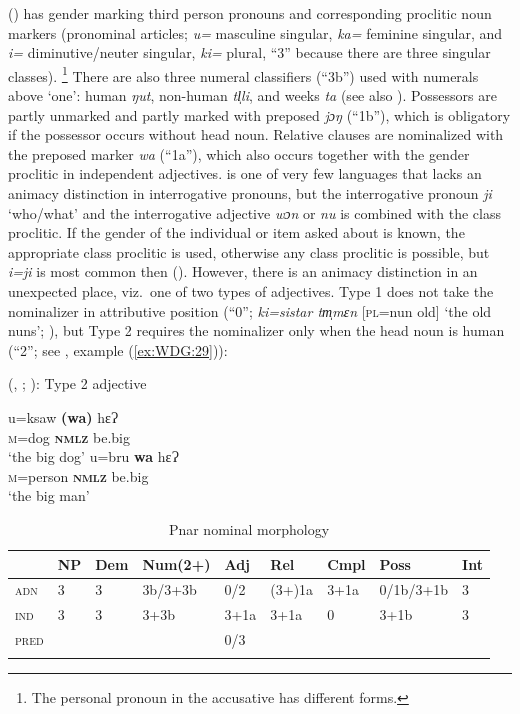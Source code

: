 \documentclass[output=collectionpaper]{langsci/langscibook}
\begin{document}
 (\citealt{Ring2015}) has gender marking third person pronouns and corresponding proclitic noun markers (pronominal articles; \textit{u=} masculine singular, \textit{ka=} feminine singular, and \textit{i=} diminutive/neuter singular, \textit{ki=} plural, ``3'' because there are three singular classes).%
\footnote{%
The personal pronoun in the accusative has different forms.
} %
There are also three numeral classifiers (``3b'') used with numerals above `one': human \textit{ŋut}, non-human \textit{tl̩li}, and weeks \textit{ta} (see also ). Possessors are partly unmarked and partly marked with preposed \textit{jɔŋ} (``1b''), which is obligatory if the possessor occurs without head noun. Relative clauses are nominalized with the preposed marker \textit{wa} (``1a''), which also occurs \textendash{} together with the gender proclitic \textendash{} in independent adjectives.  is one of very few languages that lacks an animacy distinction in interrogative pronouns, but the interrogative pronoun \textit{ji} `who/what' and the interrogative adjective \textit{wɔn} or \textit{nu} is combined with the class proclitic. If the gender of the individual or item asked about is known, the appropriate class proclitic is used, otherwise any class proclitic is possible, but \textit{i=ji} is most common then (\citealt[235]{Ring2015}). However, there is an animacy distinction in an unexpected place, viz.\ one of two types of adjectives. Type 1 does not take the nominalizer in attributive position (``0''; \textit{ki=sistar tm̩mɛn} [\textsc{pl}=nun old] `the old nuns'; \citealt[173]{Ring2015}), but Type 2 requires the nominalizer only when the head noun is human (``2''; see , example (\ref{ex:WDG:29})):

\ea\label{ex:WDG:29}
 (, ; \citealt[177]{Ring2015}): Type 2 adjective\\
\begin{xlist}
\ex
\gll	u=ksaw	\textbf{(wa)}	hɛɁ \\
		\textsc{m}=dog 	\textbf{\textsc{nmlz}}	be.big\\
\glt		`the big dog'
\ex
\gll u=bru 	\textbf{wa} 	hɛɁ \\
		\textsc{m}=person 	\textbf{\textsc{nmlz}} 	be.big\\
\glt		`the big man'
\end{xlist}
\z

\begin{table}
\caption{Pnar nominal morphology}
\begin{tabular}{>{\scshape}l*{8}{l}}
\lsptoprule
&	NP	&	Dem	&	Num(2+)	&	Adj	&	Rel	&	Cmpl	&	Poss	&	Int	\\
\midrule
adn	&	3	&	3	&	3b/3+3b	&	0/2	&	(3+)1a	&	3+1a	&	0/1b/3+1b	&	3	\\
ind	&	3	&	3	&	3+3b	&	3+1a	&	3+1a	&	0	&	3+1b	&	3	\\
pred	&		&		&		&	0/3	&		&		&		&		\\
\lspbottomrule
\end{tabular}
\label{tab:WDG:11}
\end{table}
\end{document}
